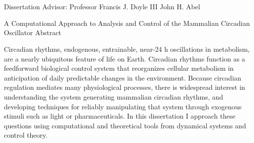\section*{}


{\vspace*{-1in}
    Dissertation Advisor: Professor Francis J. Doyle III \hfill John H. Abel

    \begin{center}
{A Computational Approach to Analysis and Control of the Mammalian Circadian Oscillator}
\vspace{0.5cm}
Abstract
\end{center}

\RaggedRight

Circadian rhythms, endogenous, entrainable, near-24 h oscillations in metabolism, are a nearly ubiquitous feature of life on Earth.
Circadian rhythms function as a feedforward biological control system that reorganizes cellular metabolism in anticipation of daily predictable changes in the environment.
Because circadian regulation mediates many physiological processes, there is widespread interest in understanding the system generating mammalian circadian rhythms, and developing techniques for reliably manipulating that system through exogenous stimuli such as light or pharmaceuticals.
In this dissertation I approach these questions using computational and theoretical tools from dynamical systems and control theory.

}
